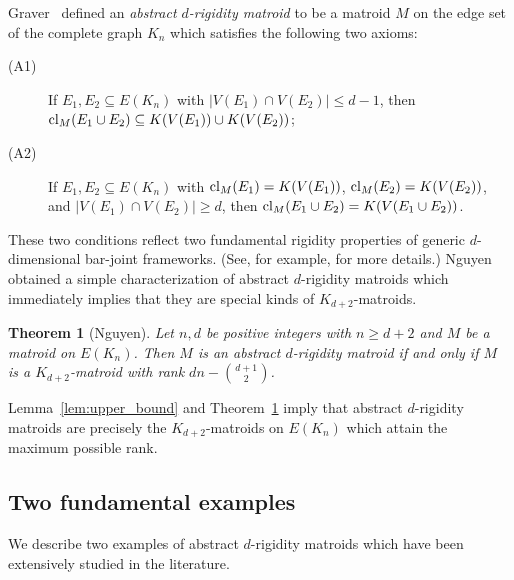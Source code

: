 \documentclass{daj}
\newtheorem{theorem}[thm]{Theorem}\theoremstyle{plain}
\begin{document}
Graver~\cite{G91} defined an {\em abstract $d$-rigidity matroid} to be
a matroid $M$ on the edge set of the complete graph $K_n$ which satisfies the following two axioms:
\begin{description}
\item[(A1)] If $E_1, E_2\subseteq E(K_n)$ with $|V(E_1)\cap V(E_2)|\leq d-1$, then
${\rm cl}_M(E_1\cup E_2)\subseteq K(V(E_1))\cup K(V(E_2))$;
\item[(A2)] If $E_1, E_2\subseteq E(K_n)$ with ${\rm cl}_M(E_1)=K(V(E_1))$, ${\rm cl}_M(E_2)=K(V(E_2))$, and $|V(E_1)\cap V(E_2)|\geq d$, then
${\rm cl}_M(E_1\cup E_2)= K(V(E_1\cup E_2))$.
\end{description}
These two conditions reflect two fundamental rigidity properties of generic $d$-dimensional bar-joint frameworks. (See, for example, \cite{GSS93} for more details.)
Nguyen~\cite{N10} obtained a simple characterization of abstract $d$-rigidity matroids which immediately implies that they are special kinds of $K_{d+2}$-matroids.

\begin{theorem}[Nguyen{\cite[Theorem 2.2]{N10}}]\label{thm:hang}
Let $n,d$ be positive integers with $n\geq d+2$ and $M$ be a matroid on
$E(K_n)$.
Then $M$ is an abstract $d$-rigidity matroid if and only if
$M$ is a $K_{d+2}$-matroid with  rank $dn-{d+1\choose 2}$.
\end{theorem}

Lemma~\ref{lem:upper_bound} and Theorem~\ref{thm:hang} imply that abstract $d$-rigidity matroids are precisely the $K_{d+2}$-matroids on $E(K_n)$ which attain the maximum possible rank.

\subsection{Two fundamental examples} \label{subsec:examples}
We describe two examples of abstract $d$-rigidity matroids which have been extensively studied in the literature.
\end{document}
